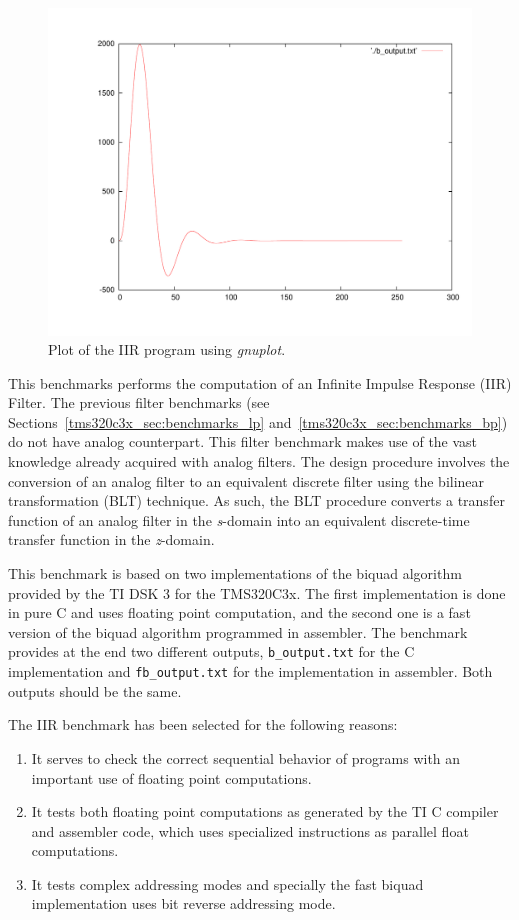 \begin{figure}[!h]
	\begin{center}
		\includegraphics[width=.8\textwidth]{tms320c3x/fig_iir_output.pdf}
		\caption{\label{fig:tms320c3x_manual_iir_output}Plot of the IIR program using \textit{gnuplot}.}
	\end{center}
\end{figure}

This benchmarks performs the computation of an Infinite Impulse Response (IIR) Filter.
The previous filter benchmarks (see Sections~\ref{tms320c3x_sec:benchmarks_lp} and~\ref{tms320c3x_sec:benchmarks_bp}) do not have analog counterpart.
This filter benchmark makes use of the vast knowledge already acquired with analog filters.
The design procedure involves the conversion of an analog filter to an equivalent discrete filter using the bilinear transformation (BLT) technique.
As such, the BLT procedure converts a transfer function of an analog filter in the \textit{s}-domain into an equivalent discrete-time transfer function in the \textit{z}-domain.

This benchmark is based on two implementations of the biquad algorithm provided by the TI DSK 3 for the TMS320C3x.
The first implementation is done in pure C and uses floating point computation, and the second one is a fast version of the biquad algorithm programmed in assembler.
The benchmark provides at the end two different outputs, \texttt{b\_output.txt} for the C implementation and \texttt{fb\_output.txt} for the implementation in assembler.
Both outputs should be the same.

The IIR benchmark has been selected for the following reasons:
\begin{enumerate}
	\item It serves to check the correct sequential behavior of programs with an important use of floating point computations.
	\item It tests both floating point computations as generated by the TI C compiler and assembler code, which uses specialized instructions as parallel float computations.
	\item It tests complex addressing modes and specially the fast biquad implementation uses bit reverse addressing mode.
\end{enumerate}

